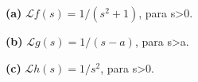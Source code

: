 \noindent\textbf{(a)} \(\mathcal Lf(s)=1/(s^2+1)\), para s>0.

\noindent\textbf{(b)} \(\mathcal Lg(s)=1/(s-a)\), para s>a.

\noindent\textbf{(c)} \(\mathcal Lh(s)=1/s^2\), para s>0.
